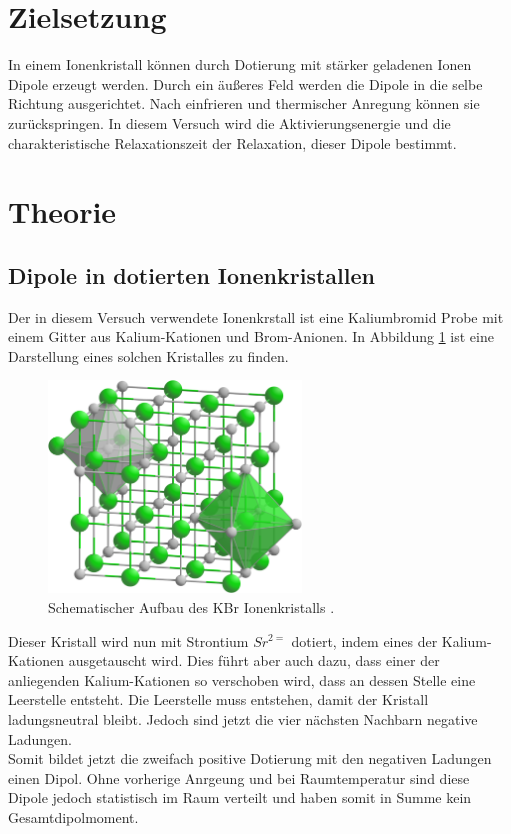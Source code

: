 \section{Zielsetzung}
In einem Ionenkristall können durch Dotierung mit stärker geladenen Ionen Dipole erzeugt werden. 
Durch ein äußeres Feld werden die Dipole in die selbe Richtung ausgerichtet.
Nach einfrieren und thermischer Anregung können sie zurückspringen.
In diesem Versuch wird die Aktivierungsenergie und die charakteristische Relaxationszeit der Relaxation, dieser Dipole bestimmt.


\section{Theorie}
	\subsection{Dipole in dotierten Ionenkristallen}
		Der in diesem Versuch verwendete Ionenkrstall ist eine Kaliumbromid Probe mit einem Gitter aus Kalium-Kationen und Brom-Anionen.
		In Abbildung \ref{fig:KBr} ist eine Darstellung eines solchen Kristalles zu finden.
		\begin{figure}
			\centering
			\includegraphics[width = 0.6\textwidth]{latex/images/Kristall2.PNG}
			\caption{Schematischer Aufbau des KBr Ionenkristalls \cite{KBr}.
			}
			\label{fig:KBr}
		\end{figure}
		Dieser Kristall wird nun mit Strontium $Sr^{2=}$ dotiert, indem eines der Kalium-Kationen ausgetauscht wird.
		Dies führt aber auch dazu, dass einer der anliegenden Kalium-Kationen so verschoben wird, dass an dessen Stelle eine Leerstelle entsteht.
		Die Leerstelle muss entstehen, damit der Kristall ladungsneutral bleibt.
		Jedoch sind jetzt die vier nächsten Nachbarn negative Ladungen.\\
		Somit bildet jetzt die zweifach positive Dotierung mit den negativen Ladungen einen Dipol. 
		Ohne vorherige Anrgeung und bei Raumtemperatur sind diese Dipole jedoch statistisch im Raum verteilt und haben somit in Summe kein Gesamtdipolmoment. 

